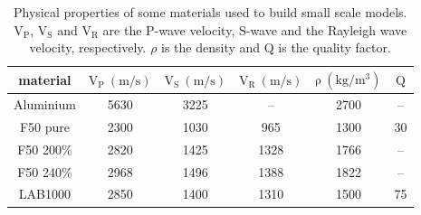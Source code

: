 \documentclass[manuscript,revised]{geophysics}
\begin{document}
\begin{table}[!ht]
	\centering
	\begin{tabular}{cccccc}
		\hline
		material & $\mathrm{V_{P}\ (m/s)}$ & $\mathrm{V_{S}\ (m/s)}$ & $\mathrm{V_{R}\ (m/s)}$ & $\mathrm{\rho\ (kg/m^{3})}$ & $\mathrm{Q}$ \\
		\hline
		Aluminium & 5630 & 3225 & --   & 2700 & --  \\
		F50 pure  & 2300 & 1030 & 965  & 1300 & 30  \\
		F50 200\% & 2820 & 1425 & 1328 & 1766 & --  \\
		F50 240\% & 2968 & 1496 & 1388 & 1822 & --  \\
		LAB1000   & 2850 & 1400 & 1310 & 1500 & 75  \\
		\hline
	\end{tabular}
	\caption{Physical properties of some materials used to build small scale models. $\mathrm{V_{P}}$, $\mathrm{V_{S}}$ and $\mathrm{V_{R}}$ are the P-wave velocity, S-wave and the Rayleigh wave velocity, respectively. $\rho$ is the density and $\mathrm{Q}$ is the quality factor.}
	\label{epoxy-resin}
\end{table}

%		
\end{document}
